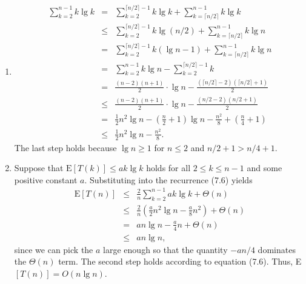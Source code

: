 \documentclass[a4paper, fleqn]{article}
\begin{document}
\begin{enumerate}
\item  %
\begin{eqnarray*}
\sum_{k=2}^{n-1} k \lg k
& = & \sum_{k=2}^{\lceil n/2 \rceil - 1} k \lg k + \sum_{k=\lceil n/2 \rceil}^{n-1} k \lg k \\
& \leq & \sum_{k=2}^{\lceil n/2 \rceil - 1} k \lg(n/2) + \sum_{k=\lceil n/2 \rceil}^{n-1} k \lg n \\
& = & \sum_{k=2}^{\lceil n/2 \rceil - 1} k (\lg n - 1) + \sum_{k=\lceil n/2 \rceil}^{n-1} k \lg n \\
& = & \sum_{k=2}^{n-1} k \lg n - \sum_{k=2}^{\lceil n/2 \rceil - 1} k \\
& = & \frac{(n-2)(n+1)}{2} \cdot \lg n - \frac{(\lceil n/2 \rceil - 2)(\lceil n/2 \rceil + 1)}{2} \\
& \leq & \frac{(n-2)(n+1)}{2} \cdot \lg n - \frac{(n/2-2)(n/2+1)}{2} \\
& = & \frac{1}{2} n^2 \lg n - \left(\frac{n}{2} + 1\right) \lg n - \frac{n^2}{8} + \left(\frac{n}{4} + 1\right) \\
& \leq & \frac{1}{2} n^2 \lg n - \frac{n^2}{8}.
\end{eqnarray*}
The last step holds because $\lg n \geq 1$ for $n \leq 2$ and $n/2 + 1 > n/4 + 1$.



\item  %
Suppose that $\mbox{E}[T(k)] \leq ak \lg k$ holds for all $2 \leq k \leq n - 1$ 
and some positive constant $a$. Substituting into the recurrence (7.6) yields
\begin{eqnarray*}
\mbox{E}[T(n)]
& \leq & \frac{2}{n} \sum_{k=2}^{n-1} ak \lg k + \Theta(n) \\
& \leq & \frac{2}{n} \left(\frac{a}{2} n^2 \lg n - \frac{a}{8}n^2\right) + \Theta(n) \\
& = & an \lg n - \frac{a}{4}n + \Theta(n) \\
& \leq & an \lg n,
\end{eqnarray*}
since we can pick the $a$ large enough so that the quantity $-an/4$ 
dominates the $\Theta(n)$ term. The second step holds according to equation 
(7.6). Thus, E$[T(n)] = O(n \lg n)$.


\end{enumerate}
\end{document}
